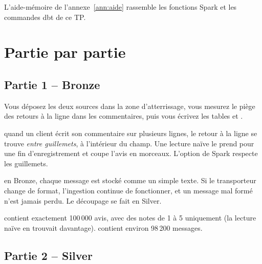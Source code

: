 L'aide-mémoire de l'annexe~\ref{ann:aide} rassemble les fonctions Spark et les commandes dbt de ce TP.

\section{Partie par partie}

\subsection*{Partie 1 -- Bronze \hfill {}}

Vous déposez les deux sources dans la zone d'atterrissage, vous mesurez le piège des retours à la
ligne dans les commentaires, puis vous écrivez les tables  et .

\begin{notion}
quand un client écrit son commentaire
sur plusieurs lignes, le retour à la ligne se trouve \emph{entre guillemets}, à l'intérieur du champ.
Une lecture naïve le prend pour une fin d'enregistrement et coupe l'avis en morceaux. L'option
 de Spark respecte les guillemets.
\end{notion}

\begin{notion}
en Bronze, chaque message est stocké comme un simple texte. Si le
transporteur change de format, l'ingestion continue de fonctionner, et un message mal formé n'est
jamais perdu. Le découpage se fait en Silver.
\end{notion}

\begin{resultat}
 contient exactement 100\,000 avis, avec des notes de 1 à 5 uniquement (la lecture
naïve en trouvait davantage).  contient environ 98\,200 messages.
\end{resultat}


\subsection*{Partie 2 -- Silver \hfill {}}

